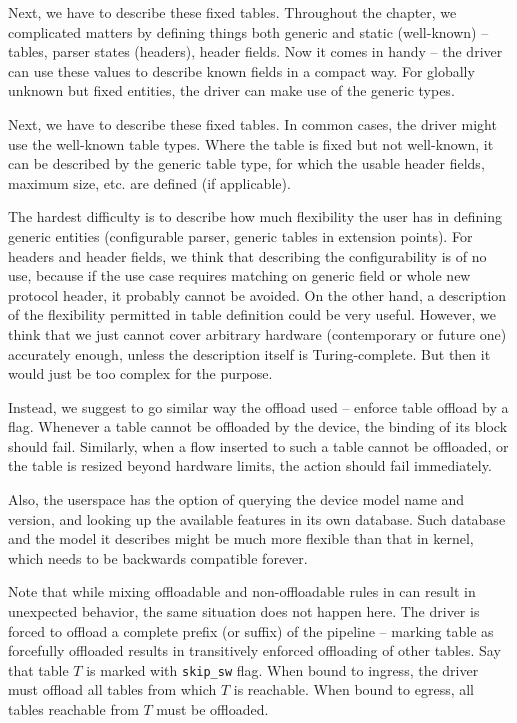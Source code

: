 Next, we have to describe these fixed tables. Throughout the chapter, we complicated
matters by defining things both generic and static (well-known) -- tables,
parser states (headers), header fields. Now it comes in handy -- the driver can
use these values to describe known fields in a compact way. For globally
unknown but fixed entities, the driver can make use of the generic types.

Next, we have to describe these fixed tables. In common cases, the driver might
use the well-known table types. Where the table is fixed but not well-known, it
can be described by the generic table type, for which the usable header fields,
maximum size, etc. are defined (if applicable).

The hardest difficulty is to describe how much flexibility the user has in
defining generic entities (configurable parser, generic tables in extension
points). For headers and header fields, we think that describing the
configurability is of no use, because if the use case requires matching on
generic field or whole new protocol header, it probably cannot be avoided.
On the other hand, a description of the flexibility permitted in table definition could be very
useful. However, we think that we just cannot cover arbitrary hardware (contemporary
or future one) accurately enough, unless the description itself is
Turing-complete. But then it would just be too complex for the purpose.

Instead, we suggest to go similar way the  offload used -- enforce
table offload by a flag. Whenever a table cannot be offloaded by the device,
the binding of its block should fail. Similarly, when a flow inserted to such
a table cannot be offloaded, or the table is resized beyond hardware limits, the
action should fail immediately.

Also, the userspace has the option of querying the device model name and
version, and looking up the available features in its own database. Such database
and the model it describes might be much more flexible than that in kernel,
which needs to be backwards compatible forever.

Note that while mixing offloadable and non-offloadable rules in  can
result in unexpected behavior, the same situation does not happen here. The driver is
forced to offload a complete prefix (or suffix) of the pipeline -- marking table as forcefully
offloaded results in transitively enforced offloading of other tables. Say that
table $T$ is marked with \texttt{skip\_sw} flag. When bound to ingress, the
driver must offload all tables from which $T$ is reachable. When bound to
egress, all tables reachable from $T$ must be offloaded.

